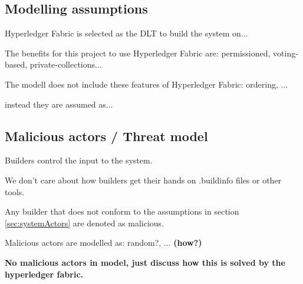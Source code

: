 \subsection{Modelling assumptions}
\label{sec:modellingAssumptions}

Hyperledger Fabric is selected as the DLT to build the system on...

The benefits for this project to use Hyperledger Fabric are: permissioned, voting-based, private-collections...

The modell does not include these features of Hyperledger Fabric: ordering, ...

instead they are assumed as...

\subsection{Malicious actors / Threat model}
\label{sec:maliciousActors}

Builders control the input to the system.

We don't care about how builders get their hands on .buildinfo files or other tools.

Any builder that does not conform to the assumptions in section \ref{sec:systemActors} are denoted as malicious.

Malicious actors are modelled as: random?, ... \textbf{(how?)}

\textbf{No malicious actors in model, just discuss how this is solved by the hyperledger fabric.}